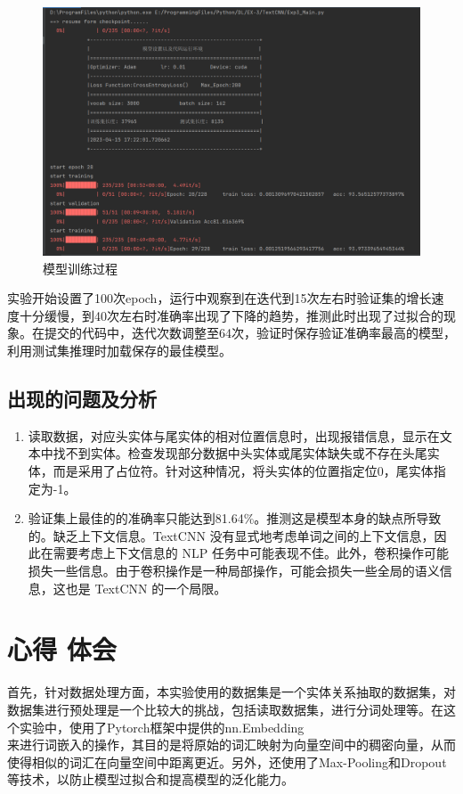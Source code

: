 \documentclass{report}
\begin{document}
	\begin{figure}[!htbp]
		\centering
		\includegraphics[width=1.2\textwidth]{fig/running.png}
		\caption{模型训练过程}
		\label{fig:run}
	\end{figure}

	实验开始设置了100次epoch，运行中观察到在迭代到15次左右时验证集的增长速度十分缓慢，到40次左右时准确率出现了下降的趋势，推测此时出现了过拟合的现象。在提交的代码中，迭代次数调整至64次，验证时保存验证准确率最高的模型，利用测试集推理时加载保存的最佳模型。
	
	\section{出现的问题及分析}
	
	\begin{enumerate}
		\item 读取数据，对应头实体与尾实体的相对位置信息时，出现报错信息，显示在文本中找不到实体。检查发现部分数据中头实体或尾实体缺失或不存在头尾实体，而是采用了占位符。针对这种情况，将头实体的位置指定位0，尾实体指定为-1。
		
		\item 验证集上最佳的的准确率只能达到81.64\%。推测这是模型本身的缺点所导致的。缺乏上下文信息。TextCNN 没有显式地考虑单词之间的上下文信息，因此在需要考虑上下文信息的 NLP 任务中可能表现不佳。此外，卷积操作可能损失一些信息。由于卷积操作是一种局部操作，可能会损失一些全局的语义信息，这也是 TextCNN 的一个局限。
	\end{enumerate}
	
	
	\chapter{心得 体会}
	首先，针对数据处理方面，本实验使用的数据集是一个实体关系抽取的数据集，对数据集进行预处理是一个比较大的挑战，包括读取数据集，进行分词处理等。在这个实验中，使用了Pytorch框架中提供的nn.Embedding\\来进行词嵌入的操作，其目的是将原始的词汇映射为向量空间中的稠密向量，从而使得相似的词汇在向量空间中距离更近。另外，还使用了Max-Pooling和Dropout等技术，以防止模型过拟合和提高模型的泛化能力。
	
\end{document}
